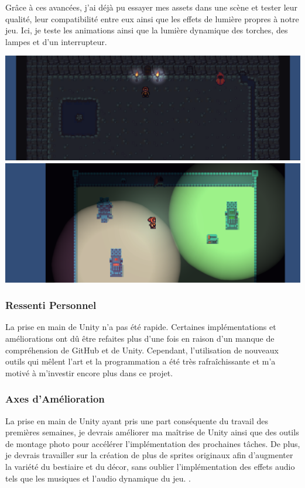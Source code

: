 \documentclass[a4page, 14pt]{extarticle}
\begin{document}
{\begin{center}
    \end{center}
Grâce à ces avancées, j'ai déjà pu essayer mes assets dans une scène et tester leur qualité, leur compatibilité entre eux ainsi que les effets de lumière propres à notre jeu. Ici, je teste les animations ainsi que la lumière dynamique des torches, des lampes et d'un interrupteur.
     \begin{center}
        \includegraphics[width=1\textwidth]{images/ImageCave}  
        \includegraphics[width=1\textwidth]{images/imageCave2.png} 
    \end{center}
}
        \subsubsection{Ressenti Personnel}
La prise en main de Unity n'a pas été rapide. Certaines implémentations et améliorations ont dû être refaites plus d'une fois en raison d'un manque de compréhension de GitHub et de Unity. Cependant, l'utilisation de nouveaux outils qui mêlent l'art et la programmation a été très rafraîchissante et m'a motivé à m'investir encore plus dans ce projet.
        \subsubsection{Axes d'Amélioration}
La prise en main de Unity ayant pris une part conséquente du travail des premières semaines, je devrais améliorer ma maîtrise de Unity ainsi que des outils de montage photo pour accélérer l'implémentation des prochaines tâches. De plus, je devrais travailler sur la création de plus de sprites originaux afin d'augmenter la variété du bestiaire et du décor, sans oublier l'implémentation des effets audio tels que les musiques et l'audio dynamique du jeu. . 
\end{document}
